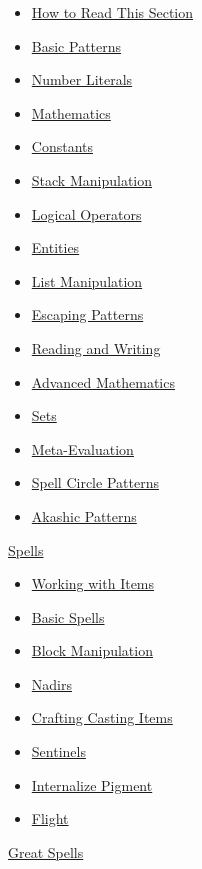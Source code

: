 \documentclass[12pt]{article}
\begin{document}
    \begin{itemize}
        \item\hyperref[ sec:patterns/readers_guide ]{ How to Read This Section}
        \item\hyperref[ sec:patterns/basics ]{ Basic Patterns}
        \item\hyperref[ sec:patterns/numbers ]{ Number Literals}
        \item\hyperref[ sec:patterns/math ]{ Mathematics}
        \item\hyperref[ sec:patterns/consts ]{ Constants}
        \item\hyperref[ sec:patterns/stackmanip ]{ Stack Manipulation}
        \item\hyperref[ sec:patterns/logic ]{ Logical Operators}
        \item\hyperref[ sec:patterns/entities ]{ Entities}
        \item\hyperref[ sec:patterns/lists ]{ List Manipulation}
        \item\hyperref[ sec:patterns/patterns_as_iotas ]{ Escaping Patterns}
        \item\hyperref[ sec:patterns/readwrite ]{ Reading and Writing}
        \item\hyperref[ sec:patterns/advanced_math ]{ Advanced Mathematics}
        \item\hyperref[ sec:patterns/sets ]{ Sets}
        \item\hyperref[ sec:patterns/meta ]{ Meta-Evaluation}
        \item\hyperref[ sec:patterns/circle ]{ Spell Circle Patterns}
        \item\hyperref[ sec:patterns/akashic_patterns ]{ Akashic Patterns}
    \end{itemize}
    \hyperref[ sec:patterns/spells ]{ Spells}

    \begin{itemize}
        \item\hyperref[ sec:patterns/spells/itempicking ]{ Working with Items}
        \item\hyperref[ sec:patterns/spells/basic ]{ Basic Spells}
        \item\hyperref[ sec:patterns/spells/blockworks ]{ Block Manipulation}
        \item\hyperref[ sec:patterns/spells/nadirs ]{ Nadirs}
        \item\hyperref[ sec:patterns/spells/hexcasting ]{ Crafting Casting Items}
        \item\hyperref[ sec:patterns/spells/sentinels ]{ Sentinels}
        \item\hyperref[ sec:patterns/spells/colorize ]{ Internalize Pigment}
        \item\hyperref[ sec:patterns/spells/flight ]{ Flight}
    \end{itemize}
    \hyperref[ sec:patterns/great_spells ]{ Great Spells}
\end{document}
